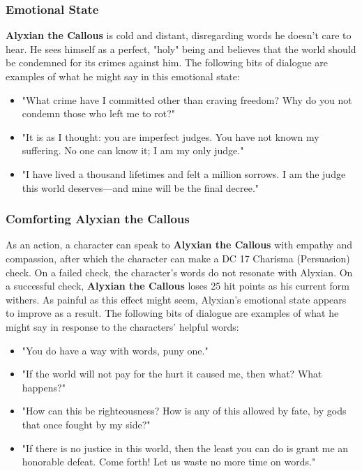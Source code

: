 \documentclass[10pt,a4,twoside,twocolumn,openany,nodeprecatedcode]{dndbook}
\begin{document}
\subsubsection{Emotional State}
\textbf{Alyxian the Callous} is cold and distant, disregarding words he doesn't care to hear. He sees himself as a perfect, "holy" being and believes that the world should be condemned for its crimes against him.
The following bits of dialogue are examples of what he might say in this emotional state:
\begin{itemize}

\item "What crime have I committed other than craving freedom? Why do you not condemn those who left me to rot?"
\item "It is as I thought: you are imperfect judges. You have not known my suffering. No one can know it; I am my only judge."
\item "I have lived a thousand lifetimes and felt a million sorrows. I am the judge this world deserves—and mine will be the final decree."
\end{itemize}


\subsubsection{Comforting Alyxian the Callous}
As an action, a character can speak to \textbf{Alyxian the Callous} with empathy and compassion, after which the character can make a DC 17 Charisma (Persuasion) check. On a failed check, the character's words do not resonate with Alyxian. On a successful check, \textbf{Alyxian the Callous} loses 25 hit points as his current form withers. As painful as this effect might seem, Alyxian's emotional state appears to improve as a result.
The following bits of dialogue are examples of what he might say in response to the characters' helpful words:
\begin{itemize}

\item "You do have a way with words, puny one."
\item "If the world will not pay for the hurt it caused me, then what? What happens?"
\item "How can this be righteousness? How is any of this allowed by fate, by gods that once fought by my side?"
\item "If there is no justice in this world, then the least you can do is grant me an honorable defeat. Come forth! Let us waste no more time on words."
\end{itemize}
\end{document}
